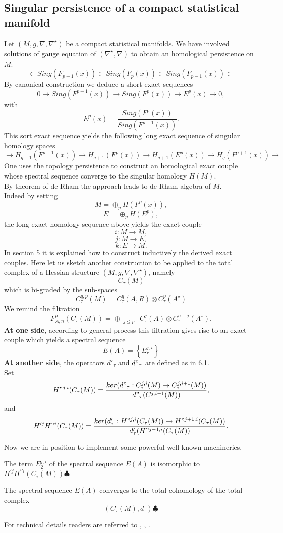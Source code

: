 \subsection{Singular persistence of a compact statistical manifold}
Let $(M,g,\nabla,\nabla^\star)$ be a compact statistical manifolds.
We have involved solutions of gauge equation of $(\nabla^\star,\nabla)$ to obtain an homological persistence on $M$:
$$\subset Sing(F_{p+1}(x))\subset Sing(F_p(x))\subset Sing(F_{p-1}(x)) \subset $$
By canonical construction we deduce a 
short exact sequences 
$$ 0\rightarrow Sing(F^{p+1}(x))\rightarrow Sing(F^p(x)) \rightarrow E^p(x)\rightarrow 0,$$
 with $$E^p(x) = \frac{Sing(F^p(x))}{Sing(F^{p+1}(x))}.$$
This sort exact sequence yields the following long exact sequence of singular homology spaces
$$\rightarrow H_{q+1}(F^{p+1}(x)) \rightarrow H_{q+1}(F^p(x))\rightarrow H_{q+1}(E^p(x))\rightarrow H_q(F^{p+1}(x))\rightarrow$$
One uses the topology persistence to construct an homological exact couple whose spectral sequence converge to the singular homology $H(M)$.\\ 
By theorem of de Rham the approach leads to de Rham algebra of $M$.\\
Indeed by setting
$$M = \oplus_p H(F^p(x)),$$
$$E = \oplus_p H(E^p),$$
the long exact homology sequence above yields the exact couple
$$i: M \rightarrow M,$$
$$j: M \rightarrow E,$$
$$k: E \rightarrow M. $$ 
In section 5 it is explained how to construct inductively the derived exact couples.
Here let us sketch another construction to be applied to the total complex of a Hessian structure $(M,g,\nabla,\nabla^\star)$, namely  
$$C_\tau(M)$$
which is bi-graded by the sub-spaces 
$$C^{q,p}_\tau(M) = C^q_\tau (A,R)\otimes C^p_\tau(A^\star)$$
We remind the filtration
$$F^p_{A,n}(C_\tau(M)) = \oplus_{[j \leq p]}C^j_\tau(A)\otimes C^{n-j}_\tau(A^\star).$$
\textbf{At one side}, according to general process this filtration gives rise to an exact couple which yields a spectral sequence 
$$E(A)= \left\{E^{j,i}_r\right\}$$
\textbf{At another side}, the operators $d'_\tau$ and $d"_\tau$ are defined  as in 6.1.\\
Set
$$ H"^{j,i}(C_\tau(M)) = \frac{ker(d"_\tau: C^{j,i}_\tau(M)\rightarrow C^{j,i+1}_\tau(M))}{d"_\tau(C^{j,i-1}(M))},$$
and 
$$H'^jH"^i(C_\tau(M)) = \frac{ker(d'_\tau: H"^{j,i}(C_\tau(M))\rightarrow H"^{j+1,i}(C_\tau(M))}{d '_\tau(H"^{j-1,i}(C_\tau(M))}.$$

Now we are in position to implement some powerful well known machineries.

\begin{thm} The term $E^{j,i}_2$ of the spectral sequence $E(A)$ is isomorphic to $H^{\prime j} H^{\prime\prime i}(C_\tau(M))\clubsuit$
\end{thm}

\begin{thm} The spectral sequence $E(A)$ converges to the total cohomology of the total complex
$$(C_\tau(M),d_\tau) \clubsuit$$
\end{thm}

For technical details readers are referred to \citep{McCleary_2000}, \citep{Whitehead1960}, \citep{maclane2012homology}.  

